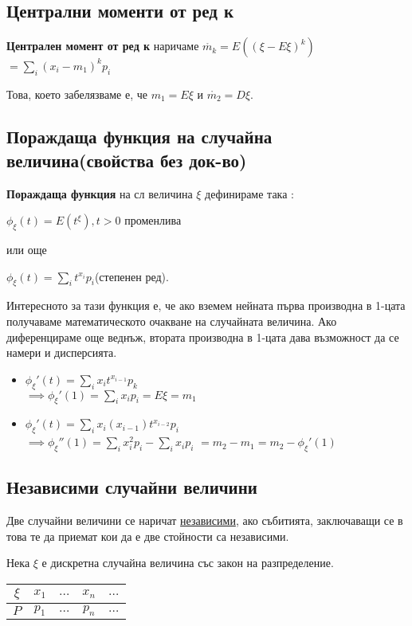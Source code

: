 \documentclass[fleqn,12pt]{article}
\begin{document}
\begin{justify}
\subsection{Централни моменти от ред к}
\textbf{Централен момент от ред к} наричаме $\mathring{m_k} = E((\xi - E\xi)^k) $
$= \sum_i (x_i-m_1)^kp_i$

Това, което забелязваме е, че $m_1 = E\xi$ и $\mathring{m_2} = D\xi$.

\subsection{Пораждаща функция на случайна величина(свойства без док-во)}
\textbf{Пораждаща функция} на сл величина $\xi$ дефинираме така :

$\phi_\xi(t) = E(t^\xi), t > 0$ променлива

или още 

$\phi_\xi(t) = \sum_i t^{x_i}p_i$(степенен ред).

Интересното за тази функция е, че ако вземем нейната първа производна в 1-цата получаваме математическото очакване на 
случайната величина. Ако диференцираме още веднъж, втората производна в 1-цата дава възможност да се намери и 
дисперсията.
\begin{itemize}
    \item $\phi_\xi'(t) = \sum_{i} x_it^{x_{i-1}}p_k$\\
    $\implies  \phi_\xi'(1) = \sum_{i} x_ip_i = E\xi = m_1$
    \item $\phi_\xi'(t) = \sum_{i} x_i(x_{i-1})t^{x_{i-2}}p_i$\\
    $\implies \phi_\xi''(1)=\sum_{i} x_i^2p_i - \sum_{i} x_ip_i$
    $= m_2 - m_1  = m_2 - \phi_\xi'(1)$
\end{itemize}

\subsection{Независими случайни величини}
Две случайни величини се наричат \underline{независими}, ако събитията, заключаващи се в това те да приемат кои да е 
две стойности са независими.

Нека $\xi$ е дискретна случайна величина със закон на разпределение.\\
\begin{tabular}{|c|c|c|c|c|}
    \hline
    $\xi$ & $x_1$ & $\dots$ & $x_n$ & $\dots$ \\
    \hline
    $P$ & $p_1$ & $\dots$ & $p_n$ & $\dots$ \\
    \hline
\end{tabular}


\end{justify}
\end{document}
